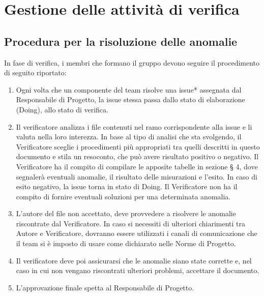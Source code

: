 \section{Gestione delle attività di verifica}
\subsection{Procedura per la risoluzione delle anomalie}
In fase di verifica, i membri che formano il gruppo devono seguire il procedimento di seguito riportato:
\begin{enumerate}
\item Ogni volta che un componente del team risolve una issue* assegnata dal Responsabile di Progetto, la issue stessa passa dallo stato di elaborazione (Doing), allo stato di verifica.
\item Il verificatore analizza i file contenuti nel ramo corrispondente alla issue e li valuta nella loro interezza. In base al tipo di analisi che sta svolgendo, il Verificatore sceglie i procedimenti più appropriati tra quelli descritti in questo documento e stila un resoconto, che può avere risultato positivo o negativo.
Il Verificatore ha il compito di compilare le apposite tabelle in sezione § 4, dove segnalerà eventuali anomalie, il risultato delle misurazioni e l'esito. In caso di esito negativo, la issue torna in stato di Doing. Il Verificatore non ha il compito di fornire eventuali soluzioni per una determinata anomalia.
\item L'autore del file non accettato, deve provvedere a risolvere le anomalie riscontrate dal Verificatore. In caso si necessiti di ulteriori chiarimenti tra Autore e Verificatore, dovranno essere utilizzati i canali di comunicazione che il team si è imposto di usare come dichiarato nelle Norme di Progetto.
\item Il verificatore deve poi assicurarsi che le anomalie siano state corrette e, nel caso in cui non vengano riscontrati ulteriori problemi, accettare il documento.
\item L'approvazione finale spetta al Responsabile di Progetto.
\end{enumerate}


